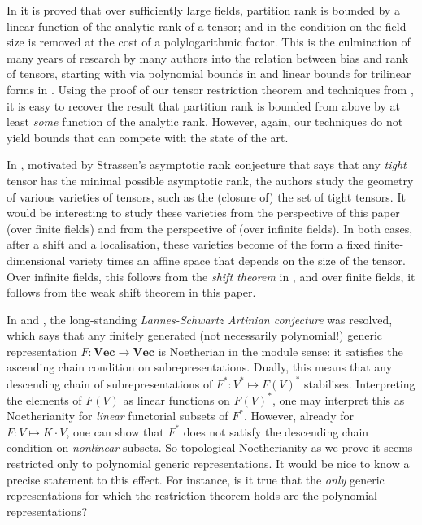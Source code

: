 \documentclass{amsart}
\renewcommand{\Vec}{\mathbf{Vec}}
\begin{document}
In \cite{Cohen21} it is proved that over sufficiently large fields,
partition rank is bounded by a linear function of the analytic rank of
a tensor; and in \cite{Moshkovitz22} the condition on the field size is
removed at the cost of a polylogarithmic factor. This is the culmination
of many years of research by many authors into the relation between
bias and rank of tensors, starting with \cite{Green09} via polynomial
bounds in \cite{Milicevic19} and linear bounds for trilinear forms in
\cite{Adiprasito21}.  Using the proof of our tensor restriction theorem
and techniques from \cite{Draisma18b}, it is easy to recover the result
that partition rank is bounded from above by at least {\em some} function
of the analytic rank. However, again, our techniques do not yield bounds
that can compete with the state of the art.

In \cite{Conner21}, motivated by Strassen's asymptotic rank conjecture that says
that any {\em tight} tensor has the minimal possible asymptotic rank, the
authors study the geometry of various varieties of tensors, such as the
(closure of) the set of tight tensors. It would be interesting to study
these varieties from the perspective of this paper (over finite fields)
and from the perspective of \cite{Bik21} (over infinite fields). In
both cases, after a shift and a localisation, these varieties become of
the form a fixed finite-dimensional variety times an affine space that
depends on the size of the tensor. Over infinite fields, this follows
from the {\em shift theorem} in \cite{Bik21}, and over finite fields,
it follows from the weak shift theorem in this paper.

In \cite{Putman14} and \cite{Sam14}, the long-standing {\em
Lannes-Schwartz Artinian conjecture} was resolved, which says that any
finitely generated (not necessarily polynomial!) generic representation
$F:\Vec \to \Vec$ is Noetherian in the module sense: it satisfies the
ascending chain condition on subrepresentations. Dually, this means that
any descending chain of subrepresentations of $F^*:V^* \mapsto F(V)^*$
stabilises. Interpreting the elements of $F(V)$ as linear functions on
$F(V)^*$, one may interpret this as Noetherianity for {\em linear}
functorial subsets of $F^*$.  However, already for $F:V \mapsto K
\cdot V$, one can show that $F^*$ does not satisfy the descending chain
condition on {\em nonlinear} subsets. So topological Noetherianity as we
prove it seems restricted only to polynomial generic representations. It
would be nice to know a precise statement to this effect.  For instance,
is it true that the {\em only} generic representations for
which the restriction theorem holds are the polynomial representations?
\end{document}
